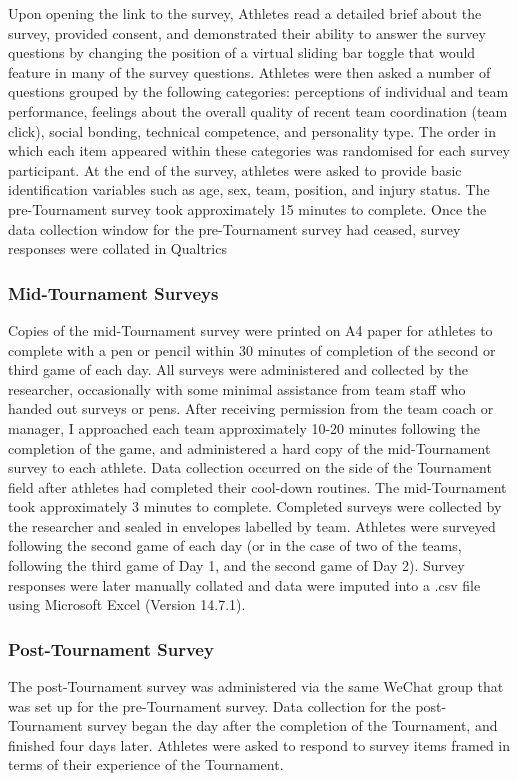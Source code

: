 Upon opening the link to the survey, Athletes read a detailed brief about the survey, provided consent, and demonstrated their ability to answer the survey questions by changing the position of a virtual sliding bar toggle that would feature in many of the survey questions.  Athletes were then asked a number of questions grouped by the following categories: perceptions of individual and team performance, feelings about the overall quality of recent team coordination (team click), social bonding, technical competence, and personality type. The order in which each item appeared within these categories was randomised for each survey participant. At the end of the survey, athletes were asked to provide basic identification variables such as age, sex, team, position, and injury status.  The pre-Tournament survey took approximately 15 minutes to complete.  Once the data collection window for the pre-Tournament survey had ceased, survey responses were collated in Qualtrics

\subsubsection{Mid-Tournament Surveys}
Copies of the mid-Tournament survey were printed on A4 paper for athletes to complete with a pen or pencil within 30 minutes of completion of the second or third game of each day. All surveys were administered and collected by the researcher, occasionally with some minimal assistance from team staff who handed out surveys or pens. After receiving permission from the team coach or manager, I approached each team approximately 10-20 minutes following the completion of the game, and administered a hard copy of the mid-Tournament survey to each athlete.  Data collection occurred on the side of the Tournament field after athletes had completed their cool-down routines.  The mid-Tournament took approximately 3 minutes to complete. Completed surveys were collected by the researcher and sealed in envelopes labelled by team. Athletes were surveyed following the second game of each day (or in the case of two of the teams, following the third game of Day 1, and the second game of Day 2).  Survey responses were later manually collated and data were imputed into a .csv file using Microsoft Excel (Version 14.7.1).

\subsubsection{Post-Tournament Survey}
The post-Tournament survey was administered via the same WeChat group that was set up for the pre-Tournament survey. Data collection for the post-Tournament survey began the day after the completion of the Tournament, and finished four days later. Athletes were asked to respond to survey items framed in terms of their experience of the Tournament.

